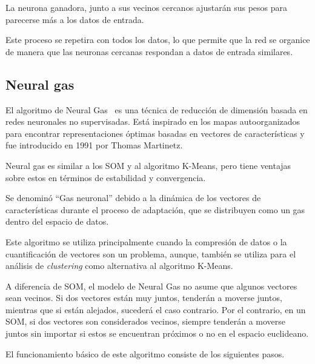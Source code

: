La neurona ganadora, junto a sus vecinos cercanos ajustarán sus pesos para parecerse más a los datos de entrada.

Este proceso se repetira con todos los datos, lo que permite que la red se organice de manera que las neuronas cercanas respondan a datos de entrada similares.

\subsection{Neural gas}

El algoritmo de Neural Gas~\cite{wiki:NeuralGas} es una técnica de reducción de dimensión basada en redes neuronales no supervisadas. Está inspirado en los mapas autoorganizados para encontrar representaciones óptimas basadas en vectores de características y fue introducido en 1991 por Thomas Martinetz.


Neural gas es similar a los SOM y al algoritmo K-Means, pero tiene ventajas sobre estos en términos de estabilidad y convergencia. 

Se denominó ``Gas neuronal'' debido a la dinámica de los vectores de características durante el proceso de adaptación, que se distribuyen como un gas dentro del espacio de datos.

Este algoritmo se utiliza principalmente cuando la compresión de datos o la cuantificación de vectores son un problema, aunque, también se utiliza para el análisis de \emph{clustering} como alternativa al algoritmo K-Means.

A diferencia de SOM, el modelo de Neural Gas no asume que algunos vectores sean vecinos. Si dos vectores están muy juntos, tenderán a moverse juntos, mientras que si están alejados, sucederá el caso contrario. Por el contrario, en un SOM, si dos vectores son considerados vecinos, siempre tenderán a moverse juntos sin importar si estos se encuentran próximos o no en el espacio euclideano.

El funcionamiento básico de este algoritmo consiste de los siguientes pasos.


